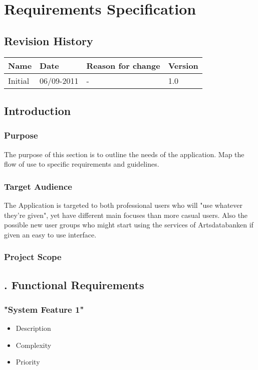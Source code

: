\section{Requirements Specification}


\subsection{Revision History}
\begin{tabular}[t]{|l|l|l|l|}\hline
Name&Date&Reason for change&Version\\\hline\hline
Initial&06/09-2011&-&1.0\\\hline
\end{tabular}

\pagebreak

\subsection{ Introduction}

\subsubsection{ Purpose}
	The purpose of this section is to outline the needs of the application. Map the flow of use to specific requirements and guidelines.

\subsubsection{ Target Audience}
	The Application is targeted to both professional users who will "use whatever they're given", yet have different main focuses than more casual users. Also the possible new user groups who might start using the services of Artsdatabanken if given an easy to use interface.

\subsubsection{ Project Scope}

\pagebreak

\subsection{. Functional Requirements}
	\subsubsection{ "System Feature 1"}
	\begin{itemize}
		\item  Description
		\item  Complexity
		\item  Priority
	\end{itemize}


